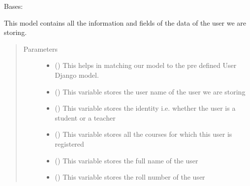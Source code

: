 \documentclass[letterpaper,10pt,english]{sphinxmanual}
\begin{document}
\begin{fulllineitems}
\label{\detokenize{users:users.models.UserProfile}}
\sphinxAtStartPar
Bases: 

\sphinxAtStartPar
This model contains all the information and fields of the data of the user we are storing.
\begin{quote}\begin{description}
\item[{Parameters}] \leavevmode\begin{itemize}
\item {} 
\sphinxAtStartPar
{} () \textendash{} This helps in matching our model to the pre defined User Django model.

\item {} 
\sphinxAtStartPar
{} () \textendash{} This variable stores the user name of the user we are storing

\item {} 
\sphinxAtStartPar
{} () \textendash{} This variable stores the identity i.e. whether the user is a student or a teacher

\item {} 
\sphinxAtStartPar
{} (\sphinxstyleliteralemphasis{\sphinxupquote{)}}) \textendash{} This variable stores all the courses for which this user is registered

\item {} 
\sphinxAtStartPar
{} () \textendash{} This variable stores the full name of the user

\item {} 
\sphinxAtStartPar
{} () \textendash{} This variable stores the roll number of the user


\end{itemize}
\end{description}
\end{quote}
\end{fulllineitems}
\end{document}
